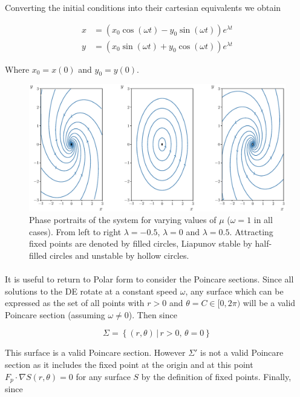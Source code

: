 \documentclass{article}
\begin{document}
Converting the initial conditions into their cartesian equivalents we obtain

\begin{align*}
	x &= (x_0\cos(\omega t) - y_0\sin(\omega t))e^{\lambda t} \\
	y &= (x_0\sin(\omega t) + y_0\cos(\omega t))e^{\lambda t}
\end{align*}

Where $x_0 = x(0)$ and $y_0 = y(0)$. 

\begin{figure}[H]
	\hspace{-0.9in}
	\includegraphics[scale= 0.6]{Q44_Phase_Portrait_All_Mu.eps}
	\caption{Phase portraits of the system for varying values of $\mu$ ($\omega = 1$ in all 
	cases).  From left to right $\lambda = -0.5$, $\lambda = 0$ and $\lambda = 0.5$. Attracting fixed points are denoted by filled circles, Liapunov stable by half-filled circles and 
	unstable by hollow circles.}
\end{figure}

\paragraph{}
It is useful to return to Polar form to consider the Poincare sections. Since all solutions to the 
DE rotate at a constant speed $\omega$, any surface which can be expressed as the set of all 
points with $r > 0$ and $\theta = C \in [0,2\pi)$ will be a valid Poincare section (assuming $\omega \neq 0$). 
Then since 

\begin{equation*}
	\Sigma = \left\{(r,\theta) \, | \, r>0, \, \theta = 0 \right\}
\end{equation*}

This surface is a valid Poincare section. However $\Sigma'$ is not a valid Poincare section as 
it includes the fixed point at the origin and at this point $F_p \cdot \nabla S(r,\theta) = 0$ 
for any surface $S$ by the definition of fixed points. Finally, since 
\end{document}
